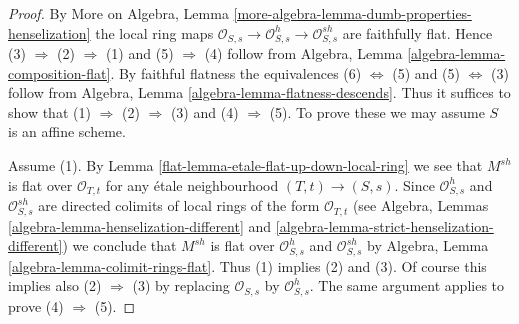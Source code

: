 \begin{proof}

By More on Algebra, Lemma
\ref{more-algebra-lemma-dumb-properties-henselization}
the local ring maps
$\mathcal{O}_{S, s} \to \mathcal{O}_{S, s}^h \to \mathcal{O}_{S, s}^{sh}$
are faithfully flat.
Hence (3) $\Rightarrow$ (2) $\Rightarrow$ (1) and
(5) $\Rightarrow$ (4) follow from
Algebra, Lemma \ref{algebra-lemma-composition-flat}.
By faithful flatness the equivalences (6) $\Leftrightarrow$ (5) and
(5) $\Leftrightarrow$ (3) follow from
Algebra, Lemma \ref{algebra-lemma-flatness-descends}.
Thus it suffices to show that
(1) $\Rightarrow$ (2) $\Rightarrow$ (3) and
(4) $\Rightarrow$ (5).
To prove these we may assume $S$ is an affine scheme.

\medskip\noindent
Assume (1). By
Lemma \ref{flat-lemma-etale-flat-up-down-local-ring}
we see that $M^{sh}$ is flat over $\mathcal{O}_{T, t}$ for
any \'etale neighbourhood $(T, t) \to (S, s)$. Since $\mathcal{O}_{S, s}^h$
and $\mathcal{O}_{S, s}^{sh}$ are directed colimits of local rings
of the form $\mathcal{O}_{T, t}$ (see
Algebra, Lemmas \ref{algebra-lemma-henselization-different}
and \ref{algebra-lemma-strict-henselization-different})
we conclude that $M^{sh}$ is flat over $\mathcal{O}_{S, s}^h$
and $\mathcal{O}_{S, s}^{sh}$ by
Algebra, Lemma \ref{algebra-lemma-colimit-rings-flat}.
Thus (1) implies (2) and (3). Of course this implies also
(2) $\Rightarrow$ (3) by replacing $\mathcal{O}_{S, s}$ by
$\mathcal{O}_{S, s}^h$. The same argument applies to prove
(4) $\Rightarrow$ (5).
\end{proof}

